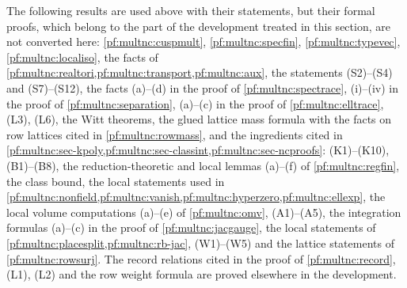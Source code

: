 \begin{remark}\label{pf:multnc:rem-deferred}
The following results are used above with their statements, but their formal proofs, which belong to the part of the
development treated in this section, are not converted here: \cref{pf:multnc:cuspmult}, \cref{pf:multnc:specfin},
\cref{pf:multnc:typevec}, \cref{pf:multnc:localiso}, the facts of \cref{pf:multnc:realtori,pf:multnc:transport,pf:multnc:aux},
the statements (S2)--(S4) and (S7)--(S12), the facts (a)--(d) in the proof of \cref{pf:multnc:spectrace}, (i)--(iv) in the
proof of \cref{pf:multnc:separation}, (a)--(c) in the proof of \cref{pf:multnc:elltrace}, (L3), (L6), the Witt theorems, the
glued lattice mass formula with the facts on row lattices cited in \cref{pf:multnc:rowmass}, and the ingredients cited in
\cref{pf:multnc:sec-kpoly,pf:multnc:sec-classint,pf:multnc:sec-ncproofs}: (K1)--(K10), (B1)--(B8), the reduction-theoretic
and local lemmas (a)--(f) of \cref{pf:multnc:regfin}, the class bound, the local statements used in
\cref{pf:multnc:nonfield,pf:multnc:vanish,pf:multnc:hyperzero,pf:multnc:ellexp}, the local volume computations (a)--(e) of
\cref{pf:multnc:omv}, (A1)--(A5), the integration formulas (a)--(c) in the proof of \cref{pf:multnc:jacgauge}, the local
statements of \cref{pf:multnc:placesplit,pf:multnc:rb-jac}, (W1)--(W5) and the lattice statements of
\cref{pf:multnc:rowsurj}. The record relations cited in the proof of \cref{pf:multnc:record}, (L1), (L2) and the row weight
formula are proved elsewhere in the development.
\end{remark}
